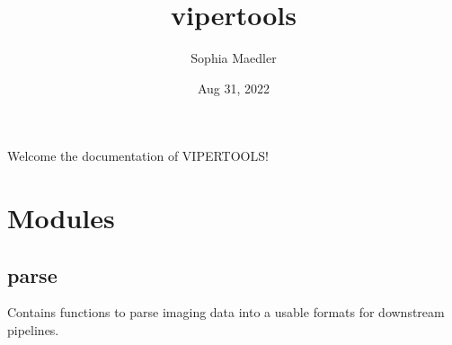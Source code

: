 \documentclass[a4paper,10pt,english,openany,oneside]{sphinxmanual}
\title{vipertools}
\date{Aug 31, 2022}
\author{Sophia Maedler}
\begin{document}
\pagestyle{empty}
\sphinxmaketitle
\pagestyle{plain}
\sphinxtableofcontents
\pagestyle{normal}
\label{\detokenize{index::doc}}


\sphinxAtStartPar
Welcome the documentation of VIPERTOOLS!


\chapter{Modules}
\label{\detokenize{pages/modules:module-vipertools.parse}}\label{\detokenize{pages/modules:modules}}\label{\detokenize{pages/modules::doc}}

\section{parse}
\label{\detokenize{pages/modules:parse}}
\sphinxAtStartPar
Contains functions to parse imaging data into a usable formats for downstream pipelines.
\end{document}
